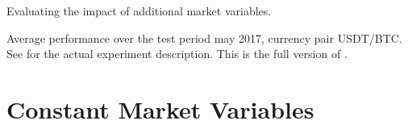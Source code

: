 \begin{table}[ht]
        		\caption[Full version of .]{Evaluating the impact of additional market variables.}
		\small Average performance over the test period may 2017, currency pair USDT/BTC.\\		
		See  for the actual experiment description. This is the full version of .
		\label{tab:eval:additionalMarketVariables:fulltable}

\end{table}
\clearpage{}



\section{Constant Market Variables}
\label{appendix:fixedMarketVars}
